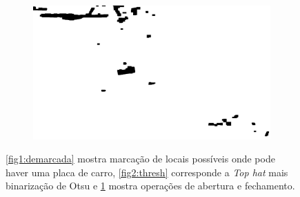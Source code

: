 \begin{figure}[H] \ContinuedFloat
    \centering
    \begin{subfigure}{0.7\textwidth}
         \includegraphics[width=\textwidth]{figuras/op_cl_n.jpg}
          \caption{}
         \label{fig3:op_cl}
         
     \end{subfigure}
     \caption{\ref{fig1:demarcada} mostra marcação de locais possíveis onde pode haver uma placa de carro, \ref{fig2:thresh} corresponde a \emph{Top hat} mais binarização de Otsu e \ref{fig3:op_cl} mostra operações de abertura e fechamento.}
    \label{fig:three graphs}
\end{figure}

